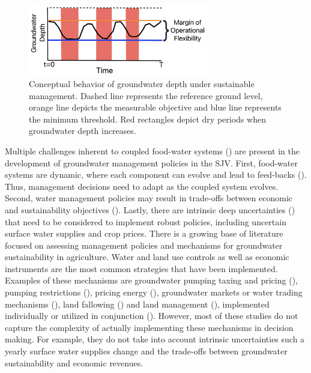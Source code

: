 \documentclass[11pt,a4paper]{article}
\begin{document}
 \begin{figure}[H]
    \centering
    \includegraphics[width=0.7\textwidth]{conceptual_sgma_policy.jpg}
    \caption{Conceptual behavior of groundwater depth under sustainable management. Dashed line represents the reference ground level, orange line depicts the measurable objective and blue line represents the minimum threshold. Red rectangles depict dry periods when groundwater depth increases.}
    \label{fig:1}
\end{figure}


Multiple challenges inherent to coupled food-water systems (\cite{polhill_modelling_2016}) are present in the development of groundwater management policies in the SJV. First, food-water systems are dynamic, where each component can evolve and lead to feed-backs (\cite{filatova_regime_2016}). Thus, management decisions need to adapt as the coupled system evolves. Second, water management policies may result in trade-offs between economic and sustainability objectives (\cite{mcdermid_minimizing_2021,stone_economic_2022,torhan_tradeoffs_2022,null_pareto_2021}). Lastly, there are intrinsic deep uncertainties (\cite{stirling_keep_2010}) that need to be considered to implement robust policies, including uncertain surface water supplies and crop prices. There is a growing base of literature focused on assessing management policies and mechanisms for groundwater sustainability in agriculture. Water and land use controls as well as economic instruments are the most common strategies that have been implemented. Examples of these mechanisms are groundwater pumping taxing and pricing  (\cite{madani_exogenous_2013,mulligan_assessing_2014,stone_economic_2022}), pumping restrictions (\cite{young_hydrologic-economic_2021,lan_performance_2021,macewan_hydroeconomic_2017,rodriguez-flores_global_2022}), pricing energy (\cite{hrozencik_impacts_2022}), groundwater markets or water trading mechanisms (\cite{khan_effect_2019,kuwayama_regulation_2013}), land fallowing (\cite{van_schmidt_linkages_2022}) and land management (\cite{bourque_balancing_2019,li_evaluation_2018,bryant_shaping_2020}), implemented individually or utilized in conjunction (\cite{graveline_combining_2020,hrozencik_heterogeneous_2017}). However, most of these studies do not capture the complexity of actually implementing these mechanisms in decision making. For example, they do not take into account intrinsic uncertainties such a yearly surface water supplies change and the trade-offs between groundwater sustainability and economic revenues. 
\end{document}
